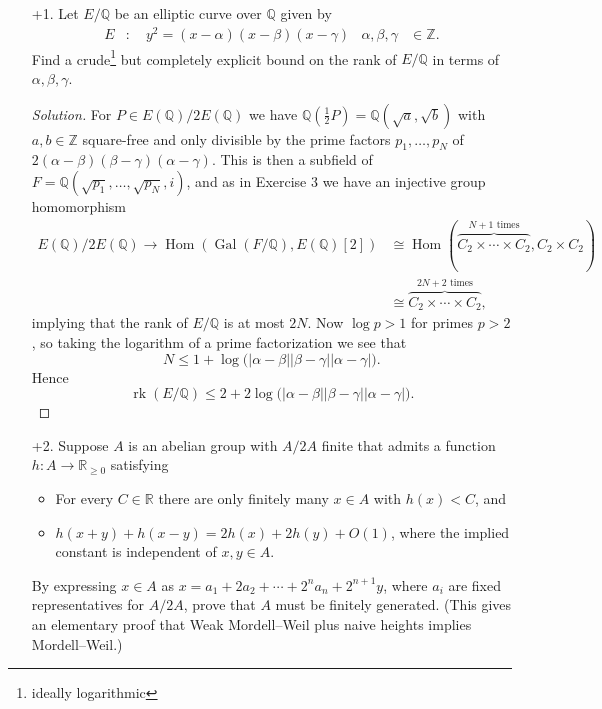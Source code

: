 \documentclass[a4paper]{article}
\theoremstyle{definition}
\DeclareMathOperator{\Hom}{Hom}
\DeclareMathOperator{\Gal}{Gal}
\DeclareMathOperator{\rk}{rk}
\newcommand{\Z}{\mathbb{Z}}
\newcommand{\Q}{\mathbb{Q}}
\newcommand{\R}{\mathbb{R}}
\begin{document}
\begin{enumerate}
    \item[+1.] Let $E/\Q$ be an elliptic curve over $\Q$ given by
        \begin{align*}
            E&:\quad y^2=(x-\alpha)(x-\beta)(x-\gamma) &
            \alpha,\beta,\gamma&\in\Z.
        \end{align*}
        Find a crude\footnote{ideally logarithmic} but completely explicit bound
        on the rank of $E/\Q$ in terms of $\alpha,\beta,\gamma$.

        \begin{proof}[Solution]
            For $P\in E(\Q)/2E(\Q)$ we have
            $\Q(\frac{1}{2}P)=\Q(\sqrt a,\sqrt b)$ with $a,b\in\Z$ square-free
            and only divisible by the prime factors $p_1,\ldots,p_N$ of
            $2(\alpha-\beta)(\beta-\gamma)(\alpha-\gamma)$. This is then a
            subfield of $F=\Q(\sqrt{p_1},\ldots,\sqrt{p_N},i)$, and as in
            Exercise 3 we have an injective group homomorphism
            \begin{align*}
                E(\Q)/2E(\Q) \to \Hom(\Gal(F/\Q),E(\Q)[2])
                    &\cong \Hom(\overbrace{C_2\times\cdots\times C_2}
                        ^{\text{$N+1$ times}},C_2\times C_2) \\
                    &\cong\overbrace{C_2\times\cdots\times C_2}
                        ^{\text{$2N+2$ times}},
            \end{align*}
            implying that the rank of $E/\Q$ is at most $2N$. Now $\log p>1$
            for primes $p>2$, so taking the logarithm of a prime factorization
            we see that
            \begin{equation*}
                N\le 1 + \log\bigl(
                    |\alpha-\beta||\beta-\gamma||\alpha-\gamma|\bigr).
            \end{equation*}
            Hence
            \begin{equation*}
                \rk(E/\Q)
                    \le 2+2\log\bigl(
                        |\alpha-\beta||\beta-\gamma||\alpha-\gamma|\bigr).
            \end{equation*}
        \end{proof}

    \item[+2.] Suppose $A$ is an abelian group with $A/2A$ finite that admits a
        function $h:A\to\R_{\ge0}$ satisfying
        \begin{itemize}
            \item For every $C\in\R$ there are only finitely many $x\in A$ with
                $h(x)<C$, and
            \item $h(x+y)+h(x-y)=2h(x)+2h(y)+O(1)$, where the implied constant
                is independent of $x,y\in A$.
        \end{itemize}
        By expressing $x\in A$ as $x=a_1+2a_2+\cdots+2^na_n+2^{n+1}y$, where
        $a_i$ are fixed representatives for $A/2A$, prove that $A$ must be
        finitely generated. (This gives an elementary proof that Weak
        Mordell--Weil plus naive heights implies Mordell--Weil.)


\end{enumerate}
\end{document}
